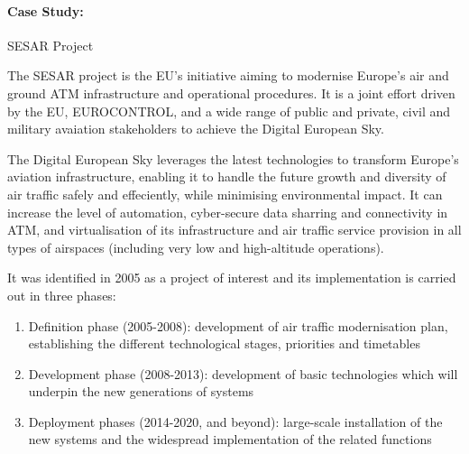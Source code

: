 \paragraph{Case Study:} \gls{SESAR} Project \cite{ec_sesar_project} \cite{skybrary_sesar}

The \gls{SESAR} project is the \gls{EU}'s initiative aiming to modernise Europe's air and ground ATM infrastructure and operational procedures.
It is a joint effort driven by the \gls{EU}, EUROCONTROL, and a wide range of public and private, civil and military avaiation stakeholders to achieve the Digital European Sky.

The Digital European Sky leverages the latest technologies to transform Europe's aviation infrastructure, enabling it to handle the future growth and diversity of air traffic safely and effeciently, while minimising environmental impact.
It can increase the level of automation, cyber-secure data sharring and connectivity in \gls{ATM}, and virtualisation of its infrastructure and air traffic service provision in all types of airspaces (including very low and high-altitude operations).

It was identified in 2005 as a project of interest and its implementation is carried out in three phases:
\begin{enumerate}
    \item Definition phase (2005-2008): development of air traffic modernisation plan, establishing the different technological stages, priorities and timetables
    \item Development phase (2008-2013): development of basic technologies which will underpin the new generations of systems
    \item Deployment phases (2014-2020, and beyond): large-scale installation of the new systems and the widespread implementation of the related functions
\end{enumerate}
